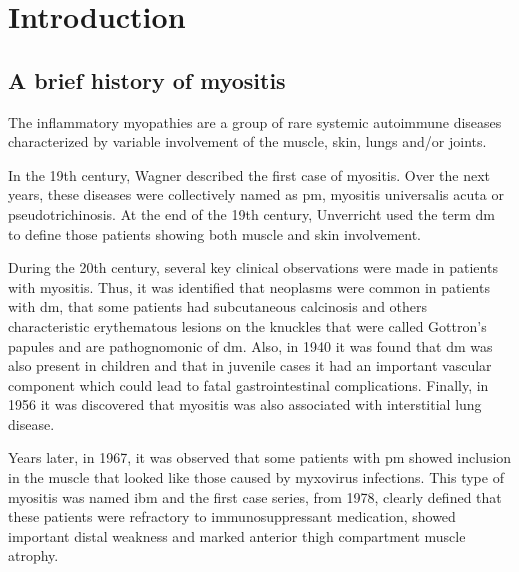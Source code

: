 \chapter{Introduction}

\section{A brief history of myositis}

The inflammatory myopathies are a group of rare systemic autoimmune diseases characterized by variable involvement of the muscle, skin, lungs and/or joints.\cite{SelvaOCallaghan2018}

In the 19th century, Wagner described the first case of myositis.\cite{Wagner1863} Over the next years, these diseases were collectively named as \gls{pm}, myositis universalis acuta or pseudotrichinosis.\cite{Pottain1875,Hepp1887,Unverricht1887,Stertz1916,Kankeleit1916,Patjes1926,Hautveränderungen1930} At the end of the 19th century, Unverricht used the term \gls{dm} to define those patients showing both muscle and skin involvement.\cite{Unverricht1891}

During the 20th century, several key clinical observations were made in patients with myositis. Thus, it was identified that neoplasms were common in patients with \gls{dm}, that some patients had subcutaneous calcinosis and others characteristic erythematous lesions on the knuckles that were called Gottron’s papules and are pathognomonic of \gls{dm}.\cite{Stertz1916,Kankeleit1916,Patjes1926,Hautveränderungen1930} Also, in 1940 it was found that \gls{dm} was also present in children and that in juvenile cases it had an important vascular component which could lead to fatal gastrointestinal complications.\cite{Hecht1940} Finally, in 1956 it was discovered that myositis was also associated with interstitial lung disease.\cite{Mills1956}

Years later, in 1967, it was observed that some patients with \gls{pm} showed inclusion in the muscle that looked like those caused by myxovirus infections.\cite{Chou1967} This type of myositis was named \gls{ibm} and the first case series, from 1978, clearly defined that these patients were refractory to immunosuppressant medication, showed important distal weakness and marked anterior thigh compartment muscle atrophy.\cite{Carpenter1978}

